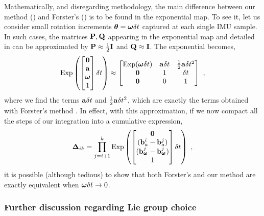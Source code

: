 Mathematically, and disregarding methodology, the main difference between our method () and Forster's \cite{forster2017-TRO} () is to be found in the exponential map. 
To see it, let us consider small rotation increments ${{\bm \theta}}={{\bm \omega}}\delta t$ captured at each single IMU sample. 
In such cases, the matrices ${\bf P},{\bf Q}$ appearing in the exponential map  and detailed in  can be approximated by ${\bf P}\approx\tfrac12{\bf I}$ and ${\bf Q}\approx{\bf I}$.
The exponential becomes,
%
\begin{align}
    \operatorname*{Exp}\left(\begin{bmatrix}
    \bf0 \\ {\bf a} \\ {{\bm \omega}} \\ 1
    \end{bmatrix}\delta t\right) \approx \begin{bmatrix}
    \operatorname*{Exp}({{\bm \omega}}\delta t) & {\bf a}\delta t & \tfrac12{\bf a}\delta t^2 \\
    \bf0 & 1 & \delta t \\
    \bf0 & 0 & 1
    \end{bmatrix}
~,
\end{align}
%
where we find the terms ${\bf a}\delta t$ and $\tfrac12{\bf a}\delta t^2$, which are exactly the terms obtained with Forster's method . 
In effect, with this approximation, if we now compact all the steps  of our integration into a cumulative expression,
%
\begin{align}
    {{\bm \Delta}}_{ik} = \prod_{j=i+1}^k \operatorname*{Exp}\left(\begin{bmatrix}
    \bf0 \\ ({\bf b}_a^i - {\bf b}_a^j) \\ ({\bf b}_{\prescript{}{}{\pmb{\omega}}_{}}^j-{\bf b}_{\prescript{}{}{\pmb{\omega}}_{}}^j) \\ 1
    \end{bmatrix}\delta t\right)
~,
\end{align}
%
it is possible (although tedious) to show that both Forster's and our method are exactly equivalent when ${{\bm \omega}}\delta t\to0$.



\subsubsection{Further discussion regarding Lie group choice}

